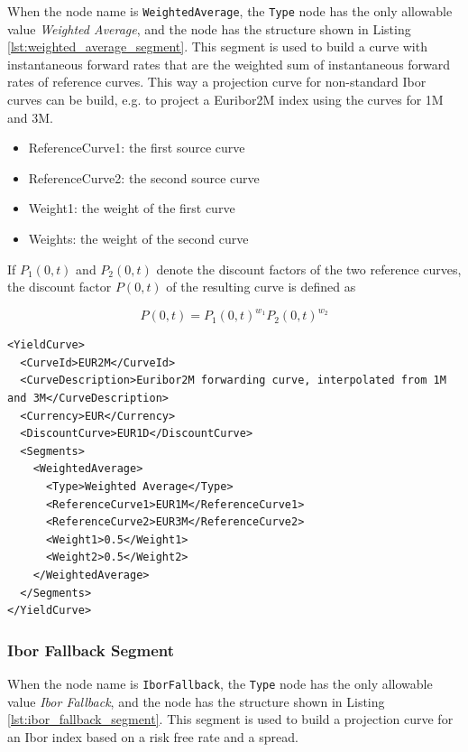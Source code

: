 When the node name is \lstinline!WeightedAverage!, the \lstinline!Type! node has the only allowable value
\emph{Weighted Average}, and the node has the structure shown in Listing \ref{lst:weighted_average_segment}. This segment
is used to build a curve with instantaneous forward rates that are the weighted sum of instantaneous forward rates of
reference curves. This way a projection curve for non-standard Ibor curves can be build, e.g. to project a Euribor2M
index using the curves for 1M and 3M.

\begin{itemize}
\item ReferenceCurve1: the first source curve
\item ReferenceCurve2: the second source curve
\item Weight1: the weight of the first curve
\item Weights: the weight of the second curve
\end{itemize}

If $P_1(0,t)$ and $P_2(0,t)$ denote the discount factors of the two reference curves, the discount factor $P(0,t)$ of
the resulting curve is defined as

\begin{equation}
P(0,t) = P_1(0,t)^{w_1}P_2(0,t)^{w_2}
\end{equation}

\begin{listing}[H]
\begin{verbatim}
<YieldCurve>
  <CurveId>EUR2M</CurveId>
  <CurveDescription>Euribor2M forwarding curve, interpolated from 1M and 3M</CurveDescription>
  <Currency>EUR</Currency>
  <DiscountCurve>EUR1D</DiscountCurve>
  <Segments>
    <WeightedAverage>
      <Type>Weighted Average</Type>
      <ReferenceCurve1>EUR1M</ReferenceCurve1>
      <ReferenceCurve2>EUR3M</ReferenceCurve2>
      <Weight1>0.5</Weight1>
      <Weight2>0.5</Weight2>
    </WeightedAverage>
  </Segments>
</YieldCurve>
\end{verbatim}
\caption{Weighted Average yield curve segment}
\label{lst:weighted_average_segment}
\end{listing}

\subsubsection*{Ibor Fallback Segment}
\label{sec:ibor_fallback_curve_segment}

When the node name is \lstinline!IborFallback!, the \lstinline!Type! node has the only allowable value \emph{Ibor
  Fallback}, and the node has the structure shown in Listing \ref{lst:ibor_fallback_segment}. This segment is used to
build a projection curve for an Ibor index based on a risk free rate and a spread.

